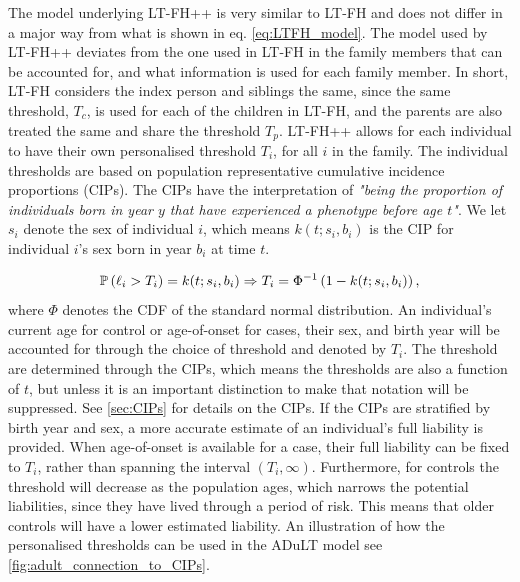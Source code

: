 The model underlying LT-FH++ is very similar to LT-FH and does not differ in a major way from what is shown in eq. \ref{eq:LTFH_model}. The model used by LT-FH++ deviates from the one used in LT-FH in the family members that can be accounted for, and what information is used for each family member. In short, LT-FH considers the index person and siblings the same, since the same threshold, $ T_c $, is used for each of the children in LT-FH, and the parents are also treated the same and share the threshold $ T_p $. LT-FH++ allows for each individual to have their own personalised threshold $ T_i $, for all $ i $ in the family. The individual thresholds are based on population representative cumulative incidence proportions (CIPs). The CIPs have the interpretation of \textit{"being the proportion of individuals born in year $ y $ that have experienced a phenotype before age $ t $"}. We let $ s_i $ denote the sex of individual $ i $, which means $ k(t; s_i, b_i) $ is the CIP for individual $ i $'s sex born in year $ b_i $ at time $ t $.

\begin{align*}
\mathbb{P}\left( \ell_i > T_i \right) = k(t; s_i, b_i) \Rightarrow T_i = \Phi^{-1} \left(1 - k(t; s_i, b_i) \right),
\end{align*}
where $ \Phi $ denotes the CDF of the standard normal distribution. An individual's current age for control or age-of-onset for cases, their sex, and birth year will be accounted for through the choice of threshold and denoted by $ T_i $. The threshold are determined through the CIPs, which means the thresholds are also a function of $ t $, but unless it is an important distinction to make that notation will be suppressed. See \cref{sec:CIPs} for details on the CIPs. If the CIPs are stratified by birth year and sex, a more accurate estimate of an individual's full liability is provided. When age-of-onset is available for a case, their full liability can be fixed to $ T_i $, rather than spanning the interval $ (T_i, \infty) $. Furthermore, for controls the threshold will decrease as the population ages, which narrows the potential liabilities, since they have lived through a period of risk. This means that older controls will have a lower estimated liability. An illustration of how the personalised thresholds can be used in the ADuLT model see \cref{fig:adult_connection_to_CIPs}.

